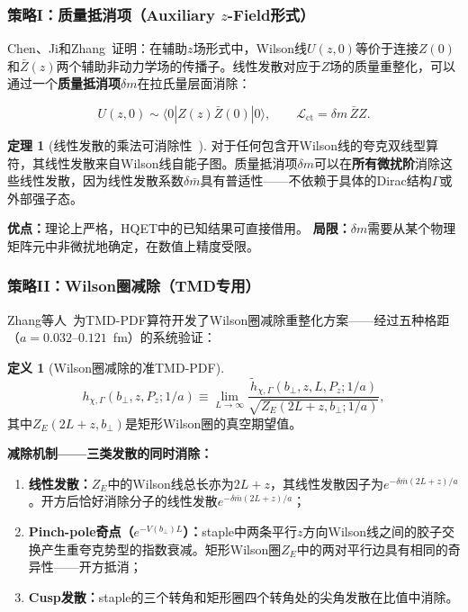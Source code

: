 \documentclass[12pt,a4paper]{ctexart}
\theoremstyle{definition}
\newtheorem{definition}{定义}[section]
\newtheorem{theorem}{定理}[section]
\begin{document}
\subsubsection{策略I：质量抵消项（Auxiliary $z$-Field形式）}

Chen、Ji和Zhang~\cite{Chen2018WLrenorm}证明：在辅助$z$场形式中，Wilson线$U(z,0)$等价于连接$Z(0)$和$\bar Z(z)$两个辅助非动力学场的传播子。线性发散对应于$Z$场的质量重整化，可以通过一个\textbf{质量抵消项}$\delta m$在拉氏量层面消除：

\begin{equation}
U(z,0) \sim \langle 0| Z(z) \bar Z(0) |0 \rangle, \qquad
\mathcal{L}_{\text{ct}} = \delta m \, \bar Z Z.
\label{eq:zfield_counterterm}
\end{equation}

\begin{theorem}[线性发散的乘法可消除性~\cite{Chen2018WLrenorm}]
对于任何包含开Wilson线的夸克双线型算符，其线性发散来自Wilson线自能子图。质量抵消项$\delta m$可以在\textbf{所有微扰阶}消除这些线性发散，因为线性发散系数$\delta\bar m$具有普适性——不依赖于具体的Dirac结构$\Gamma$或外部强子态。
\end{theorem}

\textbf{优点：}理论上严格，HQET中的已知结果可直接借用。
\textbf{局限：}$\delta m$需要从某个物理矩阵元中非微扰地确定，在数值上精度受限。

\subsubsection{策略II：Wilson圈减除（TMD专用）}

Zhang等人~\cite{Zhang2022renormTMD}为TMD-PDF算符开发了Wilson圈减除重整化方案——经过五种格距（$a=0.032\text{--}0.121$~fm）的系统验证：

\begin{definition}[Wilson圈减除的准TMD-PDF]
\begin{equation}
\boxed{h_{\chi,\Gamma}(b_\perp, z, P_z; 1/a) \equiv \lim_{L\to\infty} \frac{\tilde{h}_{\chi,\Gamma}(b_\perp, z, L, P_z; 1/a)}{\sqrt{Z_E(2L+z, b_\perp; 1/a)}}},
\label{eq:wilson_loop_subtraction}
\end{equation}
其中$Z_E(2L+z, b_\perp)$是矩形Wilson圈的真空期望值。
\end{definition}

\textbf{减除机制——三类发散的同时消除：}
\begin{enumerate}[nosep]
    \item \textbf{线性发散：}$Z_E$中的Wilson线总长亦为$2L+z$，其线性发散因子为$e^{-\delta\bar m(2L+z)/a}$。开方后恰好消除分子的线性发散$e^{-\delta\bar m(2L+z)/a}$；
    \item \textbf{Pinch-pole奇点（$e^{-V(b_\perp)L}$）：}staple中两条平行$z$方向Wilson线之间的胶子交换产生重夸克势型的指数衰减。矩形Wilson圈$Z_E$中的两对平行边具有相同的奇异性——开方抵消；
    \item \textbf{Cusp发散：}staple的三个转角和矩形圈四个转角处的尖角发散在比值中消除。
\end{enumerate}
\end{document}
